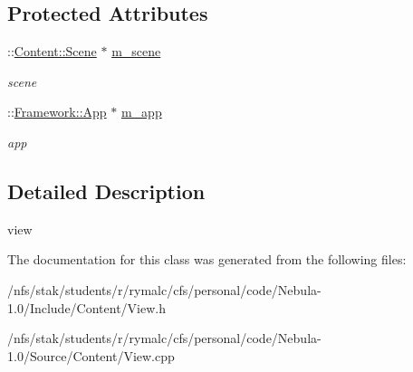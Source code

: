 \subsection*{Protected Attributes}
\begin{DoxyCompactItemize}
\item 
\hypertarget{classContent_1_1View_a6144c1382c6b4d1b3bb624afd221da50}{
::\hyperlink{classContent_1_1Scene}{Content::Scene} $\ast$ \hyperlink{classContent_1_1View_a6144c1382c6b4d1b3bb624afd221da50}{m\_\-scene}}
\label{classContent_1_1View_a6144c1382c6b4d1b3bb624afd221da50}

\begin{DoxyCompactList}\small\item\em scene \item\end{DoxyCompactList}\item 
\hypertarget{classContent_1_1View_a92de6f08a9497d7ad7ecda24e97194aa}{
::\hyperlink{classFramework_1_1App}{Framework::App} $\ast$ \hyperlink{classContent_1_1View_a92de6f08a9497d7ad7ecda24e97194aa}{m\_\-app}}
\label{classContent_1_1View_a92de6f08a9497d7ad7ecda24e97194aa}

\begin{DoxyCompactList}\small\item\em app \item\end{DoxyCompactList}\end{DoxyCompactItemize}


\subsection{Detailed Description}
view 

The documentation for this class was generated from the following files:\begin{DoxyCompactItemize}
\item 
/nfs/stak/students/r/rymalc/cfs/personal/code/Nebula-\/1.0/Include/Content/View.h\item 
/nfs/stak/students/r/rymalc/cfs/personal/code/Nebula-\/1.0/Source/Content/View.cpp\end{DoxyCompactItemize}
